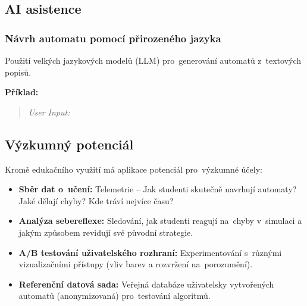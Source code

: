 \documentclass[
  master,
  program=ainfvs,
  printversion,
  figures=false,
  tables=false,
  glossaries,
  index
]{kidiplom}
\begin{document}
\subsection{AI asistence}

\subsubsection{Návrh automatu pomocí přirozeného jazyka}
Použití velkých jazykových modelů (LLM) pro~generování automatů z~textových popisů.

\textbf{Příklad:}
\begin{quote}
\textit{User Input:} 
\end{quote}

\subsection{Výzkumný potenciál}
Kromě edukačního využití má aplikace potenciál pro~výzkumné účely:

\begin{itemize}
    \item \textbf{Sběr dat o~učení:} Telemetrie -- Jak studenti skutečně navrhují automaty? Jaké dělají chyby? Kde tráví nejvíce času?
    \item \textbf{Analýza sebereflexe:} Sledování, jak studenti reagují na~chyby v~simulaci a jakým způsobem revidují své původní strategie.
    \item \textbf{A/B testování uživatelského rozhraní:} Experimentování s~různými vizualizačními přístupy (vliv barev a rozvržení na~porozumění).
    \item \textbf{Referenční datová sada:} Veřejná databáze uživatelsky vytvořených automatů (anonymizovaná) pro~testování algoritmů.
\end{itemize}
\end{document}
